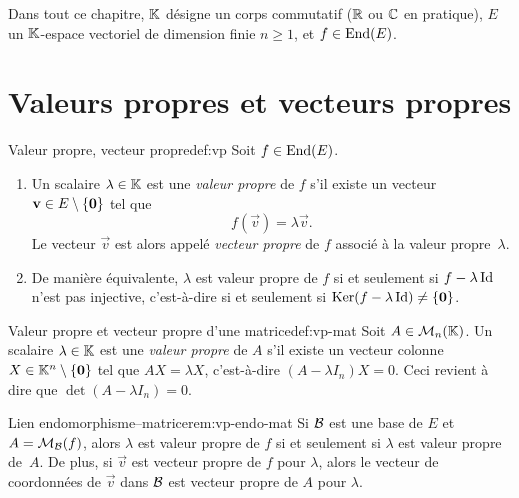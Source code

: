 \medskip

Dans tout ce chapitre, ${\mathbb{K}}$ désigne un corps commutatif (${\mathbb{R}}$ ou ${\mathbb{C}}$
en pratique), $E$ un ${\mathbb{K}}$-espace vectoriel de dimension finie
$n\geq 1$, et $f\in\operatorname{End}(E)$.

\section{Valeurs propres et vecteurs propres}\label{sec:vp-def}

\begin{definition}{Valeur propre, vecteur propre}{def:vp}
  Soit $f\in\operatorname{End}(E)$.
  \begin{enumerate}[label=(\roman*)]
    \item Un scalaire $\lambda\in{\mathbb{K}}$ est une \emph{valeur propre} de $f$
      s'il existe un vecteur $\mathbf{v}\in E\setminus\left\{\mathbf{0}\right\}$ tel que
      \[
        f(\vec{v})=\lambda\vec{v}.
      \]
      Le vecteur $\vec{v}$ est alors appelé \emph{vecteur propre} de $f$
      associé à la valeur propre~$\lambda$.
    \item De manière équivalente, $\lambda$ est valeur propre de $f$ si
      et seulement si $f-\lambda\operatorname{Id}$ n'est pas injective, c'est-à-dire
      si et seulement si $\operatorname{Ker}(f-\lambda\operatorname{Id})\neq\left\{\mathbf{0}\right\}$.
  \end{enumerate}
\end{definition}

\begin{definition}{Valeur propre et vecteur propre d'une matrice}{def:vp-mat}
  Soit $A\in\mathcal{M}_n({\mathbb{K}})$.
  Un scalaire $\lambda\in{\mathbb{K}}$ est une \emph{valeur propre} de $A$ s'il
  existe un vecteur colonne $X\in{\mathbb{K}}^n\setminus\left\{\mathbf{0}\right\}$ tel que
  $AX=\lambda X$, c'est-à-dire $(A-\lambda I_n)X=0$.
  Ceci revient à dire que $\det(A-\lambda I_n)=0$.
\end{definition}

\begin{remark}{Lien endomorphisme--matrice}{rem:vp-endo-mat}
  Si ${\mathcal{B}}$ est une base de $E$ et $A=\mathcal{M}_{\mathcal{B}}(f)$, alors $\lambda$ est
  valeur propre de $f$ si et seulement si $\lambda$ est valeur propre
  de~$A$. De plus, si $\vec{v}$ est vecteur propre de $f$ pour
  $\lambda$, alors le vecteur de coordonnées de $\vec{v}$ dans ${\mathcal{B}}$
  est vecteur propre de $A$ pour $\lambda$.
\end{remark}

